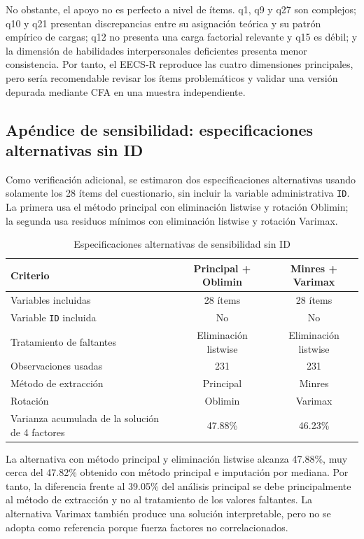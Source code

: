 \documentclass[12pt,letterpaper]{article}
\begin{document}
No obstante, el apoyo no es perfecto a nivel de ítems. q1, q9 y q27 son complejos; q10 y q21 presentan discrepancias entre su asignación teórica y su patrón empírico de cargas; q12 no presenta una carga factorial relevante y q15 es débil; y la dimensión de habilidades interpersonales deficientes presenta menor consistencia. Por tanto, el EECS-R reproduce las cuatro dimensiones principales, pero sería recomendable revisar los ítems problemáticos y validar una versión depurada mediante CFA en una muestra independiente.



\subsection{Apéndice de sensibilidad: especificaciones alternativas sin ID}

Como verificación adicional, se estimaron dos especificaciones alternativas usando solamente los 28 ítems del cuestionario, sin incluir la variable administrativa \texttt{ID}. La primera usa el método principal con eliminación listwise y rotación Oblimin; la segunda usa residuos mínimos con eliminación listwise y rotación Varimax.

\begin{table}[H]
\centering
\small
\caption{Especificaciones alternativas de sensibilidad sin ID}
\begin{tabular}{p{}cc}
\toprule
Criterio & Principal + Oblimin & Minres + Varimax \\
\midrule
Variables incluidas & 28 ítems & 28 ítems \\
Variable \texttt{ID} incluida & No & No \\
Tratamiento de faltantes & Eliminación listwise & Eliminación listwise \\
Observaciones usadas & 231 & 231 \\
Método de extracción & Principal & Minres \\
Rotación & Oblimin & Varimax \\
Varianza acumulada de la solución de 4 factores & 47.88\% & 46.23\% \\
\bottomrule
\end{tabular}
\end{table}

La alternativa con método principal y eliminación listwise alcanza 47.88\%, muy cerca del 47.82\% obtenido con método principal e imputación por mediana. Por tanto, la diferencia frente al 39.05\% del análisis principal se debe principalmente al método de extracción y no al tratamiento de los valores faltantes. La alternativa Varimax también produce una solución interpretable, pero no se adopta como referencia porque fuerza factores no correlacionados.
\end{document}
